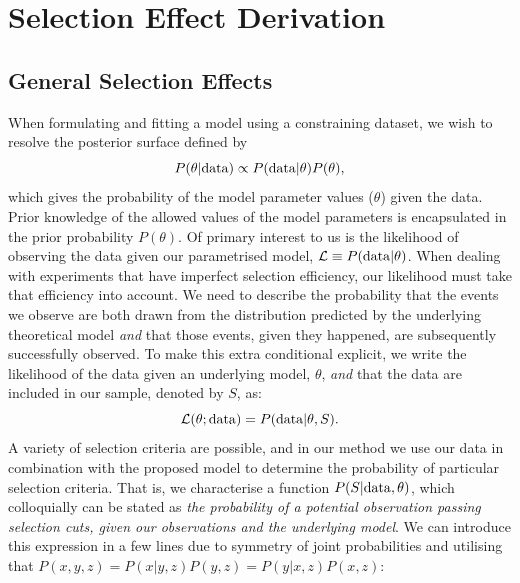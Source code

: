 \documentclass[a4paper,fleqn,usenatbib,manuscript]{emulateapj}
\begin{document}









\appendix

\section{Selection Effect Derivation}
\label{app:selection}

\subsection{General Selection Effects}
\label{app:selection1}
When formulating and fitting a model using a constraining dataset, we wish to resolve the posterior surface defined by
\begin{equation}
P(\theta | {\rm data}) \propto P({\rm data} | \theta) P(\theta),
\end{equation}
which gives the probability of the model parameter values ($\theta$) given the data.  Prior knowledge of the allowed values of the model parameters is encapsulated in the prior probability $P(\theta)$. Of primary interest to us is the likelihood of observing the data given our parametrised model, $\mathcal{L} \equiv P({\rm data} | \theta)$. When dealing with experiments that have imperfect selection efficiency, our likelihood must take that efficiency into account.  We need to describe the probability that the events we observe are both drawn from the distribution predicted by the underlying theoretical model \textit{and} that those events, given they happened, are subsequently successfully observed.  To make this extra conditional explicit, we write the likelihood of the data given an underlying model, $\theta$, \textit{and} that the data are included in our sample, denoted by $S$, as:
\begin{equation}
\mathcal{L}(\theta; {\rm data}) = P({\rm data} | \theta, S). \label{eq:app_like}
\end{equation}
A variety of selection criteria are possible, and in our method we use our data in combination with the proposed model to determine the probability of particular selection criteria.  That is, we characterise a function $P(S|{\rm data},\theta)$, which colloquially can be stated as \textit{the probability of a potential observation passing selection cuts, given our observations and the underlying model}. We can introduce this expression in a few lines due to symmetry of joint probabilities and utilising that $P(x,y,z) = P(x|y,z)P(y,z) = P(y|x, z)P(x, z)$:
\end{document}
